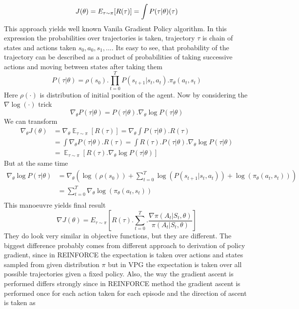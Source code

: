 \documentclass{article}
\DeclareMathOperator{\E}{\mathbb{E}}
\begin{document}
$$
 J(\theta) = E_{\tau \sim \pi} [R(\tau)] = \int  P(\tau|\theta) (\tau)\\
$$
This approach yields well known Vanila Gradient Policy algorithm.
In this expression the probabilities over trajectories is taken, trajectory $\tau$ is chain of states and actions taken $s_0, a_0, s_1, ...$. Its easy to see, that probability of the trajectory can be described as a product of probabilities of taking successive actions and moving between states after taking them 
$$
P(\tau|\theta) = \rho(s_0) .\prod_{t=0}^{T} P(s_{t+1}|s_{t}, a_{t}) .\pi_{\theta}(a_{t}, s_{t})
$$
Here $\rho(\cdot)$ is distribution of initial position of the agent. Now by considering the $\nabla \log(\cdot)$ trick
$$
\nabla_{\theta} P(\tau |\theta) = P(\tau |\theta) .\nabla_{\theta} \log P(\tau | \theta)
$$
We can transform
\begin{equation*}
    \begin{aligned}
    \nabla_{\theta} J(\theta) 
    &= \nabla_{\theta} \E_{\tau \sim \pi} [R(\tau)] = \nabla_{\theta} \int  P(\tau|\theta) .R(\tau)\\
    &= \int \nabla_{\theta} P(\tau|\theta) .R(\tau) = \int R(\tau) .P(\tau |\theta) .\nabla_{\theta} \log P(\tau | \theta) \\
    &= \E_{\tau \sim \pi} [ R(\tau) .\nabla_{\theta} \log P(\tau | \theta) ]
    \end{aligned}
\end{equation*}
But at the same time
\begin{equation*}
    \begin{aligned}
    \nabla_{\theta} \log P(\tau | \theta)
    &= \nabla_{\theta} \left(\log(\rho(s_0)) + \sum_{t=0}^{T} \log(P(s_{t+1}|s_{t}, a_{t})) + \log( \pi_{\theta}(a_{t}, s_{t}))\right)\\ 
    &= \sum_{t=0}^{T}  \nabla_{\theta}  \log( \pi_{\theta}(a_{t}, s_{t}))\\
    \end{aligned}
\end{equation*}
This manoeuvre yields final result
$$
\nabla J(\theta) = E_{\tau \sim\pi}\left[R(\tau) .\sum_{t=0}^T .\frac{\nabla \pi (A_t |S_t, \theta)}{\pi (A_t |S_t, \theta)}\right]
$$
They do look very similar in objective functions, but they are different. The biggest difference probably comes from different approach to derivation of policy gradient, since in REINFORCE the expectation is taken over actions and states sampled from given distribution $\pi$ but in VPG the expectation is taken over all possible trajectories given a fixed policy. Also, the way the gradient ascent is performed differs strongly since in REINFORCE method the gradient ascent is performed once for each action taken for each episode and the direction of ascent is taken as 
\end{document}

